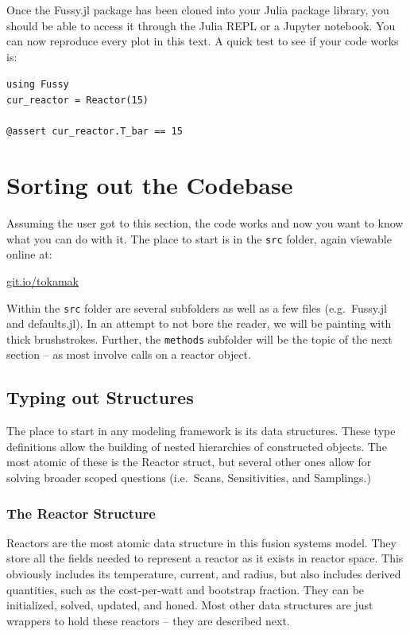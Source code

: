 Once the Fussy.jl package has been cloned into your Julia package library, you should be able to access it through the Julia REPL or a Jupyter notebook. You can now reproduce every plot in this text. A quick test to see if your code works is: \\

\begin{addmargin}[1.5em]{1.5em}
\texttt{using Fussy \\
cur\_reactor = Reactor(15) \\ \\
@assert cur\_reactor.T\_bar == 15
}
\end{addmargin}

\section{Sorting out the Codebase}

Assuming the user got to this section, the code works and now you want to know what you can do with it. The place to start is in the \texttt{src} folder, again viewable online at:

{\centering \href{http://git.io/tokamak}{git.io/tokamak} \par }

Within the \texttt{src} folder are several subfolders as well as a few files (e.g.\ Fussy.jl and defaults.jl). In an attempt to not bore the reader, we will be painting with thick brushstrokes. Further, the \texttt{methods} subfolder will be the topic of the next section -- as most involve calls on a reactor object.

\subsection{Typing out Structures}

The place to start in any modeling framework is its data structures. These type definitions allow the building of nested hierarchies of constructed objects. The most atomic of these is the Reactor struct, but several other ones allow for solving broader scoped questions (i.e.\ Scans, Sensitivities, and Samplings.)

\subsubsection{The Reactor Structure}

Reactors are the most atomic data structure in this fusion systems model. They store all the fields needed to represent a reactor as it exists in reactor space. This obviously includes its temperature, current, and radius, but also includes derived quantities, such as the cost-per-watt and bootstrap fraction. They can be initialized, solved, updated, and honed. Most other data structures are just wrappers to hold these reactors -- they are described next.

